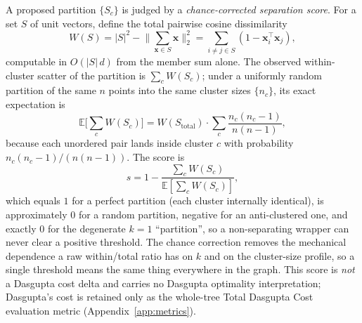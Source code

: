 A proposed partition $\{S_c\}$ is judged by a
\emph{chance-corrected separation score}.
For a set $S$ of unit vectors, define the total pairwise cosine
dissimilarity
\[
W(S) = |S|^2 - \Big\|\sum_{\mathbf{x} \in S} \mathbf{x}\Big\|_2^2
= \sum_{i \neq j \in S} \left(1 - \mathbf{x}_i^\top \mathbf{x}_j\right),
\]
computable in $O(|S|\,d)$ from the member sum alone.
The observed within-cluster scatter of the partition is
$\sum_c W(S_c)$; under a uniformly random partition of the same $n$
points into the same cluster sizes $\{n_c\}$, its exact expectation is
\[
\mathbb{E}\Big[\sum_c W(S_c)\Big]
= W(S_{\text{total}}) \cdot
\sum_c \frac{n_c (n_c - 1)}{n (n - 1)},
\]
because each unordered pair lands inside cluster $c$ with probability
$n_c(n_c-1)/(n(n-1))$.
The score is
\[
s = 1 - \frac{\sum_c W(S_c)}
{\mathbb{E}\left[\sum_c W(S_c)\right]},
\]
which equals $1$ for a perfect partition (each cluster internally
identical), is approximately $0$ for a random partition, negative for
an anti-clustered one, and exactly $0$ for the degenerate $k = 1$
``partition'', so a non-separating wrapper can never clear a
positive threshold.
The chance correction removes the mechanical dependence a raw
within/total ratio has on $k$ and on the cluster-size profile, so a
single threshold means the same thing everywhere in the graph.
This score is \emph{not} a Dasgupta cost delta and carries no
Dasgupta optimality interpretation; Dasgupta's cost
\parencite{dasgupta2016cost} is retained only as the whole-tree
Total Dasgupta Cost evaluation metric (Appendix~\ref{app:metrics}).

